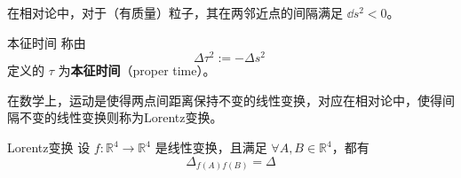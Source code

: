 在相对论中，对于（有质量）粒子，其在两邻近点的间隔满足 $\dd s^2<0$。
\begin{definition}{本征时间}
称由
\begin{equation}
\Delta \tau^2:=-\Delta s^2~
\end{equation}
定义的 $\tau$ 为\textbf{本征时间}（proper time）。
\end{definition}

在数学上，运动是使得两点间距离保持不变的线性变换，对应在相对论中，使得间隔不变的线性变换则称为Lorentz变换。
\begin{definition}{Lorentz变换}
设 $f:\mathbb R^4\rightarrow\mathbb R^4$ 是线性变换，且满足 $\forall A,B\in\mathbb R^4$，都有
\begin{equation}
\Delta_{f(A)f(B)}=\Delta
\end{equation}

\end{definition}




















